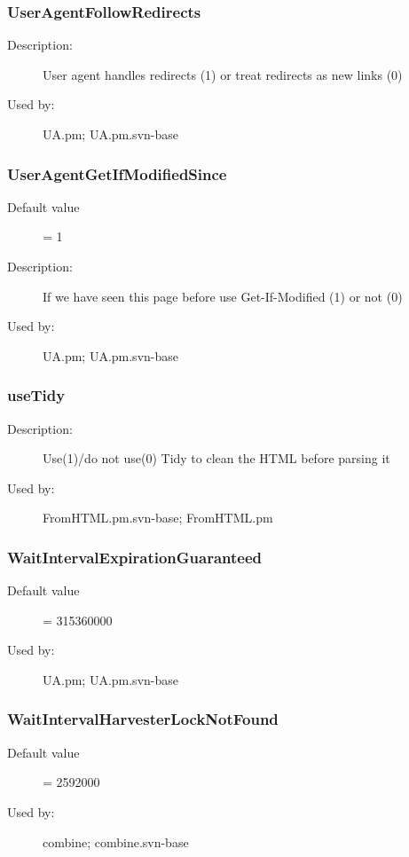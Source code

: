 \subsubsection{UserAgentFollowRedirects}
\label{UserAgentFollowRedirects}
\begin{description}
\item[Description:] User agent handles redirects (1) or treat redirects as new links (0)
\item[Used by:] UA.pm; UA.pm.svn-base
\end{description}
\subsubsection{UserAgentGetIfModifiedSince}
\label{UserAgentGetIfModifiedSince}
\begin{description}
\item[Default value] = 1
\item[Description:] If we have seen this page before use Get-If-Modified (1) or not (0)
\item[Used by:] UA.pm; UA.pm.svn-base
\end{description}
\subsubsection{useTidy}
\label{useTidy}
\begin{description}
\item[Description:] Use(1)/do not use(0) Tidy to clean the HTML before parsing it
\item[Used by:] FromHTML.pm.svn-base; FromHTML.pm
\end{description}
\subsubsection{WaitIntervalExpirationGuaranteed}
\label{WaitIntervalExpirationGuaranteed}
\begin{description}
\item[Default value] = 315360000
\item[Used by:] UA.pm; UA.pm.svn-base
\end{description}
\subsubsection{WaitIntervalHarvesterLockNotFound}
\label{WaitIntervalHarvesterLockNotFound}
\begin{description}
\item[Default value] = 2592000
\item[Used by:] combine; combine.svn-base
\end{description}
